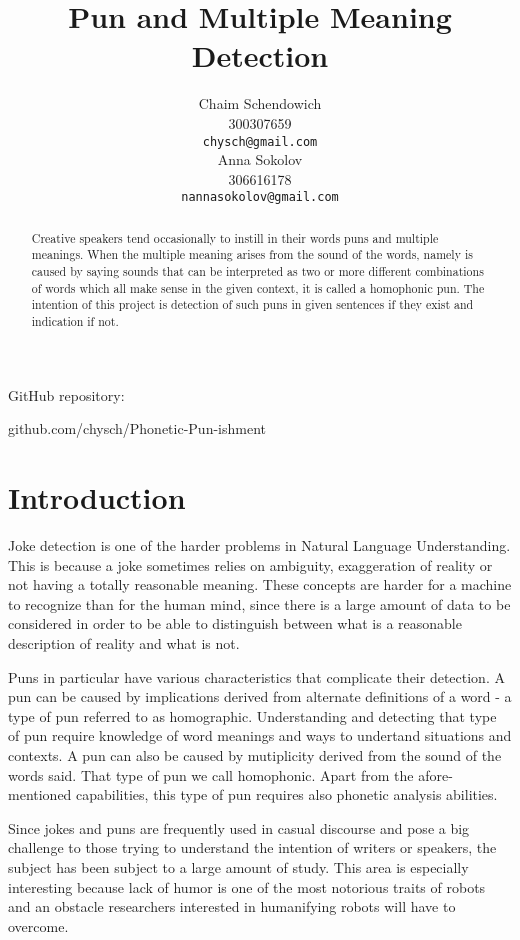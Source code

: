 \documentclass[11pt,a4paper]{article}
\title{Pun and Multiple Meaning Detection}
\author{Chaim Schendowich \\
  300307659 \\
  {\tt chysch@gmail.com} \\\And
  Anna Sokolov \\
  306616178 \\
  {\tt nannasokolov@gmail.com} \\}
\date{}
\begin{document}
\maketitle
\small{
GitHub repository:

github.com/chysch/Phonetic-Pun-ishment}

\hfill

\begin{abstract}
Creative speakers tend occasionally to instill in their words puns and multiple meanings. When the multiple meaning arises from the sound of the words, namely is caused by saying sounds that can be interpreted as two or more different combinations of words which all make sense in the given context, it is called a homophonic pun. The intention of this project is detection of such puns in given sentences if they exist and indication if not.
\end{abstract}

\section{Introduction}

Joke detection is one of the harder problems in Natural Language Understanding. This is because a joke sometimes relies on ambiguity, exaggeration of reality or not having a totally reasonable meaning. These concepts are harder for a machine to recognize than for the human mind, since there is a large amount of data to be considered in order to be able to distinguish between what is a reasonable description of reality and what is not.

Puns in particular have various characteristics that complicate their detection. A pun can be caused by implications derived from alternate definitions of a word - a type of pun referred to as homographic. Understanding and detecting that type of pun require knowledge of word meanings and ways to undertand situations and contexts. A pun can also be caused by mutiplicity derived from the sound of the words said. That type of pun we call homophonic. Apart from the afore-mentioned capabilities, this type of pun requires also phonetic analysis abilities.

Since jokes and puns are frequently used in casual discourse and pose a big challenge to those trying to understand the intention of writers or speakers, the subject has been subject to a large amount of study. This area is especially interesting because lack of humor is one of the most notorious traits of robots and an obstacle researchers interested in humanifying robots will have to overcome.
\end{document}
